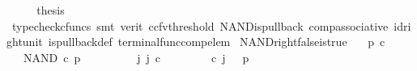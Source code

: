 \begin{isabellebody}
\ \ \isamarkupfalse%
\ \isamarkupfalse%
\ {\isacharquery}{\kern0pt}thesis\ \isanewline
\ \ \ \ \isamarkupfalse%
\ {\isacharparenleft}{\kern0pt}typecheck{\isacharunderscore}{\kern0pt}cfuncs{\isacharcomma}{\kern0pt}\ smt\ {\isacharparenleft}{\kern0pt}verit{\isacharcomma}{\kern0pt}\ ccfv{\isacharunderscore}{\kern0pt}threshold{\isacharparenright}{\kern0pt}\ NAND{\isacharunderscore}{\kern0pt}is{\isacharunderscore}{\kern0pt}pullback\ comp{\isacharunderscore}{\kern0pt}associative{}\ id{\isacharunderscore}{\kern0pt}right{\isacharunderscore}{\kern0pt}unit{}\ is{\isacharunderscore}{\kern0pt}pullback{\isacharunderscore}{\kern0pt}def\ terminal{\isacharunderscore}{\kern0pt}func{\isacharunderscore}{\kern0pt}comp{\isacharunderscore}{\kern0pt}elem{\isacharparenright}{\kern0pt}\isanewline
{}\isamarkupfalse%
%
\endisatagproof
{\isafoldproof}%
%
\isadelimproof
\isanewline
%
\endisadelimproof
\isanewline
{}\isamarkupfalse%
\ NAND{\isacharunderscore}{\kern0pt}right{\isacharunderscore}{\kern0pt}false{\isacharunderscore}{\kern0pt}is{\isacharunderscore}{\kern0pt}true{\isacharcolon}{\kern0pt}\isanewline
\ \ \ {\isachardoublequoteopen}p\ {\isasymin}\isactrlsub c\ {\isasymOmega}{\isachardoublequoteclose}\isanewline
\ \ \ {\isachardoublequoteopen}NAND\ {\isasymcirc}\isactrlsub c\ {\isasymlangle}p{\isacharcomma}{\kern0pt}{\isasymf}{\isasymrangle}\ {\isacharequal}{\kern0pt}\ {\isasymt}{\isachardoublequoteclose}\isanewline
%
\isadelimproof
%
\endisadelimproof
%
\isatagproof
{}\isamarkupfalse%
\ {\isacharminus}{\kern0pt}\ \isanewline
\ \ \isamarkupfalse%
\ {\isachardoublequoteopen}{\isasymexists}\ j{\isachardot}{\kern0pt}\ j\ {\isasymin}\isactrlsub c\ {\isasymone}{\isasymCoprod}{\isacharparenleft}{\kern0pt}{\isasymone}{\isasymCoprod}{\isasymone}{\isacharparenright}{\kern0pt}\ {\isasymand}\ {\isacharparenleft}{\kern0pt}{\isasymlangle}{\isasymf}{\isacharcomma}{\kern0pt}\ {\isasymf}{\isasymrangle}{\isasymamalg}\ {\isacharparenleft}{\kern0pt}{\isasymlangle}{\isasymt}{\isacharcomma}{\kern0pt}\ {\isasymf}{\isasymrangle}\ {\isasymamalg}{\isasymlangle}{\isasymf}{\isacharcomma}{\kern0pt}\ {\isasymt}{\isasymrangle}{\isacharparenright}{\kern0pt}{\isacharparenright}{\kern0pt}\ {\isasymcirc}\isactrlsub c\ j\ \ {\isacharequal}{\kern0pt}\ {\isasymlangle}p{\isacharcomma}{\kern0pt}{\isasymf}{\isasymrangle}{\isachardoublequoteclose}\isanewline
\ \ \ \ \isamarkupfalse%

\end{isabellebody}
